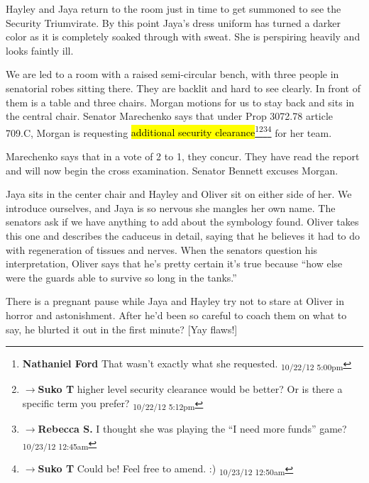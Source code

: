 Hayley and Jaya return to the room just in time to get summoned to see the Security Triumvirate.  By this point Jaya's dress uniform has turned a darker color as it is completely soaked through with sweat.  She is perspiring heavily and looks faintly ill.



We are led to a room with a raised semi-circular bench, with three people in senatorial robes sitting there.  They are backlit and hard to see clearly.  In front of them is a table and three chairs.  Morgan motions for us to stay back and sits in the central chair.  Senator Marechenko says that under Prop 3072.78 article 709.C, Morgan is requesting \hl{additional security clearance}\footnote{\textbf{Nathaniel Ford }That wasn't exactly what she requested. \textsubscript{10/22/12 5:00pm}}\footnote{$\rightarrow$\textbf{Suko T }higher level security clearance would be better?  Or is there a specific term you prefer? \textsubscript{10/22/12 5:12pm}}\footnote{$\rightarrow$\textbf{Rebecca S. }I thought she was playing the ``I need more funds'' game? \textsubscript{10/23/12 12:45am}}\footnote{$\rightarrow$\textbf{Suko T }Could be!  Feel free to amend. :) \textsubscript{10/23/12 12:50am}} for her team.



Marechenko says that in a vote of 2 to 1, they concur.  They have read the report and will now begin the cross examination.  Senator Bennett excuses Morgan.



Jaya sits in the center chair and Hayley and Oliver sit on either side of her.  We introduce ourselves, and Jaya is so nervous she mangles her own name.  The senators ask if we have anything to add about the symbology found.  Oliver takes this one and describes the caduceus in detail, saying that he believes it had to do with regeneration of tissues and nerves.  When the senators question his interpretation, Oliver says that he's pretty certain it's true because ``how else were the guards able to survive so long in the tanks.''



There is a pregnant pause while Jaya and Hayley try not to stare at Oliver in horror and astonishment.  After he'd been so careful to coach them on what to say, he blurted it out in the first minute?  {[}Yay flaws!{]}



